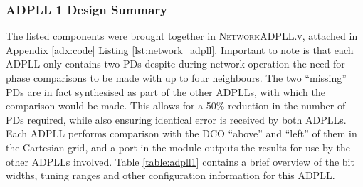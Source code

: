 \subsubsection{\acs{ADPLL} 1 Design Summary}
The listed components were brought together in \textsc{NetworkADPLL.v}, attached in Appendix \ref{adx:code} Listing \ref{lst:network_adpll}. Important to note is that each \ac{ADPLL} only contains two \acl{PD}s despite during network operation the need for phase comparisons to be made with up to four neighbours. The two ``missing'' \ac{PD}s are in fact synthesised as part of the other \ac{ADPLL}s, with which the comparison would be made. This allows for a 50\% reduction in the number of \ac{PD}s required, while also ensuring identical error is received by both \ac{ADPLL}s. Each \ac{ADPLL} performs comparison with the \ac{DCO} ``above'' and ``left'' of them in the Cartesian grid, and a port in the module outputs the results for use by the other \ac{ADPLL}s involved. %
Table \ref{table:adpll1} contains a brief overview of the bit widths, tuning ranges and other configuration information for this \ac{ADPLL}.
